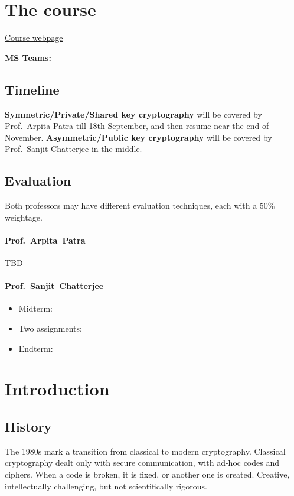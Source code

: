 \chapter*{The course} \label{chp:course}

\href{https://www.csa.iisc.ac.in/~cris/e0_235_2020.html}{Course webpage}

\textbf{MS Teams:} %

\section*{Timeline} \label{sec:timeline}
\textbf{Symmetric/Private/Shared key cryptography} will be covered by
Prof.~Arpita Patra till 18th September, and then resume near the end of
November.
\textbf{Asymmetric/Public key cryptography} will be covered by
Prof.~Sanjit Chatterjee in the middle.

\section*{Evaluation} \label{sec:evaluation}
Both professors may have different evaluation techniques, each with a 50\%
weightage.

\subsubsection{Prof.~Arpita~Patra} \label{subsec:arpita}
TBD

\subsubsection{Prof.~Sanjit~Chatterjee} \label{subsec:sanjit}
\begin{itemize}
    \item Midterm:
    \item Two assignments:
    \item Endterm:
\end{itemize}

\chapter{Introduction} \label{chp:intro}

\section{History} \label{sec:history}
The 1980s mark a transition from classical to modern cryptography.
Classical cryptography dealt only with secure communication,
with ad-hoc codes and ciphers.
When a code is broken, it is fixed, or another one is created.
Creative, intellectually challenging, but not scientifically rigorous.

